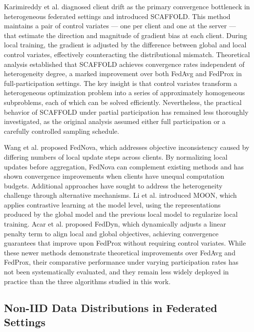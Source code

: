 \documentclass[conference]{IEEEtran}
\begin{document}
Karimireddy et al. \cite{karimireddy2020scaffold} diagnosed client drift as the primary convergence bottleneck in heterogeneous federated settings and introduced SCAFFOLD. This method maintains a pair of control variates --- one per client and one at the server --- that estimate the direction and magnitude of gradient bias at each client. During local training, the gradient is adjusted by the difference between global and local control variates, effectively counteracting the distributional mismatch. Theoretical analysis established that SCAFFOLD achieves convergence rates independent of heterogeneity degree, a marked improvement over both FedAvg and FedProx in full-participation settings. The key insight is that control variates transform a heterogeneous optimization problem into a series of approximately homogeneous subproblems, each of which can be solved efficiently. Nevertheless, the practical behavior of SCAFFOLD under partial participation has remained less thoroughly investigated, as the original analysis assumed either full participation or a carefully controlled sampling schedule.

Wang et al. \cite{wang2020fednova} proposed FedNova, which addresses objective inconsistency caused by differing numbers of local update steps across clients. By normalizing local updates before aggregation, FedNova can complement existing methods and has shown convergence improvements when clients have unequal computation budgets. Additional approaches have sought to address the heterogeneity challenge through alternative mechanisms. Li et al. \cite{li2021moon} introduced MOON, which applies contrastive learning at the model level, using the representations produced by the global model and the previous local model to regularize local training. Acar et al. \cite{acar2021feddyn} proposed FedDyn, which dynamically adjusts a linear penalty term to align local and global objectives, achieving convergence guarantees that improve upon FedProx without requiring control variates. While these newer methods demonstrate theoretical improvements over FedAvg and FedProx, their comparative performance under varying participation rates has not been systematically evaluated, and they remain less widely deployed in practice than the three algorithms studied in this work.

\subsection{Non-IID Data Distributions in Federated Settings}
\end{document}
